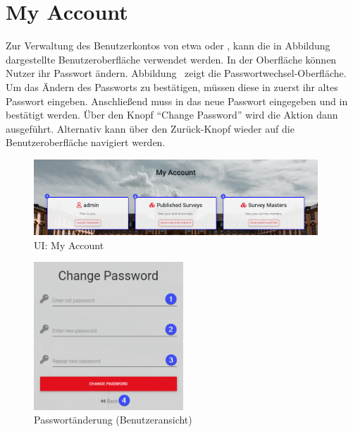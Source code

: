 \section{My Account}
\label{ssec:EigenerAccount}

Zur Verwaltung des Benutzerkontos von etwa \dutzi oder \ariane, kann die in Abbildung~ dargestellte Benutzeroberfläche verwendet werden.
In der Oberfläche können Nutzer \ua ihr Passwort ändern.
Abbildung~ zeigt die Passwortwechsel-Oberfläche.
Um das Ändern des Passworts zu bestätigen, müssen diese in \desOne zuerst ihr altes Passwort eingeben.
Anschließend muss in \desTwo das neue Passwort eingegeben und in \desThree bestätigt werden.
Über den Knopf \enquote{Change Password} wird die Aktion dann ausgeführt.
Alternativ kann über den Zurück-Knopf \desFour wieder auf die Benutzeroberfläche navigiert werden.
%
\begin{figure}[H]
	\centering
	\includegraphics[width=0.95\textwidth, keepaspectratio]{img/guide/MyAccount.png}
	\captionsetup{justification=centering, format=plain}
	\caption[\acl{UI}: My Account]{\acl{UI}: My Account\\\quelleScreenshot}
	\label{fig:MyAccount}
\end{figure}
%
\begin{figure}[H]
	\centering
	\includegraphics[width=0.5\textwidth, keepaspectratio]{img/guide/ChangeOwnPassword.png}
	\captionsetup{justification=centering, format=plain}
	\caption[Eingabemaske: Passwortänderung (Benutzeransicht)]{Passwortänderung (Benutzeransicht)\\\quelleScreenshot}
	\label{fig:ChangeOwnPassword}
\end{figure}
%
